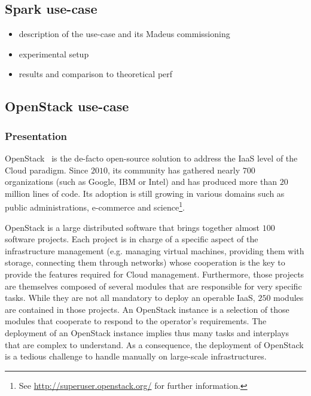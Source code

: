 
\subsection{Spark use-case}

\begin{itemize}
\item description of the use-case and its Madeus commissioning
\item experimental setup
\item results and comparison to theoretical perf
\end{itemize}

\subsection{OpenStack use-case}
\label{subsec:openstack}

\subsubsection{Presentation}

OpenStack~\cite{os:7923796} is the de-facto open-source solution to address the
IaaS level of the Cloud paradigm. Since $2010$, its community has gathered
nearly $700$ organizations (such as Google, IBM or Intel) and has produced more
than $20$ million lines of code. Its adoption is still growing in various
domains such as public administrations, e-commerce and science\footnote{See
\url{http://superuser.openstack.org/} for further information.}.

OpenStack is a large distributed software that brings together almost $100$
software projects. Each project is in charge of a specific aspect of the
infrastructure management (e.g. managing virtual machines, providing them with
storage, connecting them through networks) whose cooperation is the key to
provide the features required for Cloud management. Furthermore, those projects
are themselves composed of several modules that are responsible for very
specific tasks. While they are not all mandatory to deploy an operable IaaS,
$250$ modules are contained in those projects. An OpenStack instance is a
selection of those modules that cooperate to respond to the operator's
requirements. The deployment of an OpenStack instance implies thus many tasks
and interplays that are complex to understand. As a consequence, the deployment
of OpenStack is a tedious challenge to handle manually on large-scale
infrastructures.%

